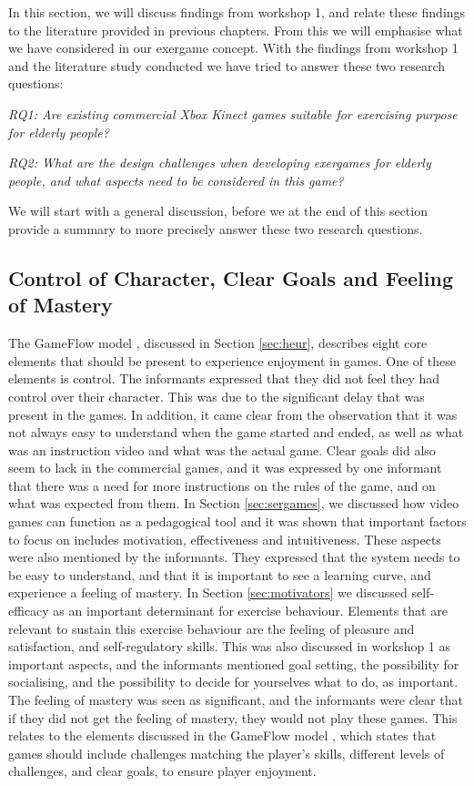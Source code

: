 In this section, we will discuss findings from workshop 1, and relate these findings to the literature provided in previous chapters. From this we will emphasise what we have considered in our exergame concept. With the findings from workshop 1 and the literature study conducted we have tried to answer these two research questions: 

\emph{RQ1: Are existing commercial Xbox Kinect games suitable for exercising purpose for elderly people?}

\emph{RQ2: What are the design challenges when developing exergames for elderly people, and what aspects need to be considered in this game?}

We will start with a general discussion, before we at the end of this section provide a summary to more precisely answer these two research questions. 

\subsection{Control of Character, Clear Goals and Feeling of Mastery}
The GameFlow model \cite{sweetser}, discussed in Section \ref{sec:heur}, describes eight core elements that should be present to experience enjoyment in games. One of these elements is control. The informants expressed that they did not feel they had control over their character. This was due to the significant delay that was present in the games. In addition, it came clear from the observation that it was not always easy to understand when the game started and ended, as well as what was an instruction video and what was the actual game. Clear goals did also seem to lack in the commercial games, and it was expressed by one informant that there was a need for more instructions on the rules of the game, and on what was expected from them. In Section \ref{sec:sergames}, we discussed how video games can function as a pedagogical tool and it was shown that important factors to focus on includes motivation, effectiveness and intuitiveness. These aspects were also mentioned by the informants. They expressed that the system needs to be easy to understand, and that it is important to see a learning curve, and experience a feeling of mastery. In Section \ref{sec:motivators} we discussed self-efficacy as an important determinant for exercise behaviour. Elements that are relevant to sustain this exercise behaviour are the feeling of pleasure and satisfaction, and self-regulatory skills. This was also discussed in workshop 1 as important aspects, and the informants mentioned goal setting, the possibility for socialising, and the possibility to decide for yourselves what to do, as important. The feeling of mastery was seen as significant, and the informants were clear that if they did not get the feeling of mastery, they would not play these games. This relates to the elements discussed in the GameFlow model \cite{sweetser}, which states that games should include challenges matching the player's skills, different levels of challenges, and clear goals, to ensure player enjoyment. 

